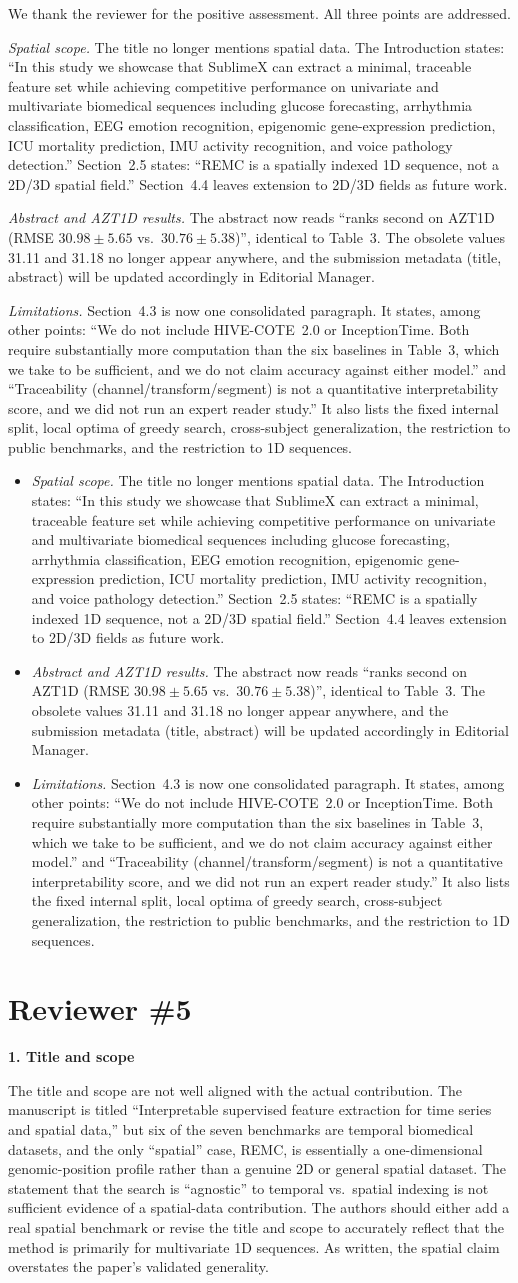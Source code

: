 \documentclass[11pt]{article}
\makeatletter
\newcommand{\rsp}{\par\vspace{0.9em}}
\newcommand{\rcitem}[2]{\begin{reviewerbox}\textbf{#1}\par\smallskip#2\end{reviewerbox}}
\newcommand{\response}[2]{%
  \begin{responsebox}#1%
  \def\@responseitems{#2}%
  \ifx\@responseitems\empty\else\begin{itemize}[nosep,leftmargin=1.2em]#2\end{itemize}\fi
  \end{responsebox}\rsp}
\makeatother
\begin{document}
\response{We thank the reviewer for the positive assessment. All three points are addressed.}{
  \item \emph{Spatial scope.} The title no longer mentions spatial data. The Introduction states:
    ``In this study we showcase that SublimeX can extract a minimal, traceable feature set while
    achieving competitive performance on univariate and multivariate biomedical sequences including
    glucose forecasting, arrhythmia classification, EEG emotion recognition, epigenomic gene-expression
    prediction, ICU mortality prediction, IMU activity recognition, and voice pathology detection.''
    Section~2.5 states: ``REMC is a spatially indexed 1D sequence, not a 2D/3D spatial field.''
    Section~4.4 leaves extension to 2D/3D fields as future work.
  \item \emph{Abstract and AZT1D results.} The abstract now reads ``ranks second on AZT1D (RMSE
    $30.98\pm5.65$ vs.\ $30.76\pm5.38$)'', identical to Table~3. The obsolete values 31.11 and 31.18
    no longer appear anywhere, and the submission metadata (title, abstract) will be updated
    accordingly in Editorial Manager.
  \item \emph{Limitations.} Section~4.3 is now one consolidated paragraph. It states, among other
    points: ``We do not include HIVE-COTE~2.0 or InceptionTime. Both require substantially more
    computation than the six baselines in Table~3, which we take to be sufficient, and we do not
    claim accuracy against either model.'' and ``Traceability (channel/transform/segment) is not a quantitative
    interpretability score, and we did not run an expert reader study.'' It also lists the fixed
    internal split, local optima of greedy search, cross-subject generalization, the restriction to
    public benchmarks, and the restriction to 1D sequences.
}

\section*{Reviewer \#5}

\rcitem{1. Title and scope}{The title and scope are not well aligned with the actual contribution.
The manuscript is titled ``Interpretable supervised feature extraction for time series and spatial
data,'' but six of the seven benchmarks are temporal biomedical datasets, and the only ``spatial''
case, REMC, is essentially a one-dimensional genomic-position profile rather than a genuine 2D or
general spatial dataset. The statement that the search is ``agnostic'' to temporal vs.\ spatial
indexing is not sufficient evidence of a spatial-data contribution. The authors should either add a
real spatial benchmark or revise the title and scope to accurately reflect that the method is
primarily for multivariate 1D sequences. As written, the spatial claim overstates the paper's
validated generality.}
\end{document}
